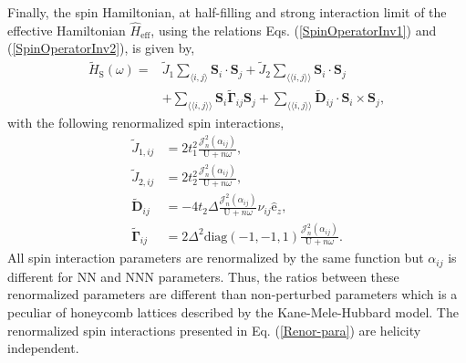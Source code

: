 \documentclass[aps,prl,twocolumn,amsmath,amssymb,nobibnotes]{revtex4-1}%
\newcommand{\n}{\nonumber}
\newcommand{\bs}{\boldsymbol}
\begin{document}
Finally, the spin Hamiltonian, at half-filling and strong interaction limit of the effective Hamiltonian $\hat{H}_{\text{eff}}$, using the relations Eqs. (\ref{SpinOperatorInv1}) and (\ref{SpinOperatorInv2}), is given by,
\begin{align}
\label{MKMHeffw}
\tilde{H}_{\text{S}}(\omega) =& \tilde{J}_{1}\sum_{\langle i,j \rangle} \bs{S}_i\cdot\bs{S}_j + \tilde{J}_{2}\sum_{\langle \langle i,j \rangle \rangle} \bs{S}_i\cdot\bs{S}_j\n \\
&+ \sum_{\langle \langle i,j \rangle \rangle} \bs{S}_i \tilde{\bs{\Gamma}}_{ij} \bs{S}_j +\sum_{\langle \langle i,j \rangle \rangle} \tilde{\bs{D}}_{ij}\cdot \bs{S}_i \times \bs{S}_j,
\end{align}
with the following renormalized spin interactions,
\begin{align}
\label{Renor-para}
\tilde{J}_{1,ij} &= 2t_1^2\frac{\mathcal{J}_{n}^2(\alpha_{ij})}{\text{U}+n\omega}, \\
\tilde{J}_{2,ij} &= 2t_2^2\frac{\mathcal{J}_{n}^2(\alpha_{ij})}{\text{U}+n\omega}, \\
\tilde{\bs{D}}_{ij} &= - 4 t_2 \Delta \frac{\mathcal{J}_{n}^2(\alpha_{ij})}{\text{U}+n\omega} \nu_{ij} \hat{\mathrm{e}}_z, \\
\tilde{\bs{\Gamma}}_{ij} &= 2\Delta^2 \text{diag}(-1,-1,1) \frac{\mathcal{J}_{n}^2(\alpha_{ij})}{\text{U}+n\omega}.
\end{align}
All spin interaction parameters are renormalized by the same function but $\alpha_{ij}$ is different for NN and NNN parameters. Thus, the ratios between these renormalized parameters are different than non-perturbed parameters which is a peculiar of honeycomb lattices described by the Kane-Mele-Hubbard model. The renormalized spin interactions presented in Eq. (\ref{Renor-para}) are helicity independent.
\end{document}
